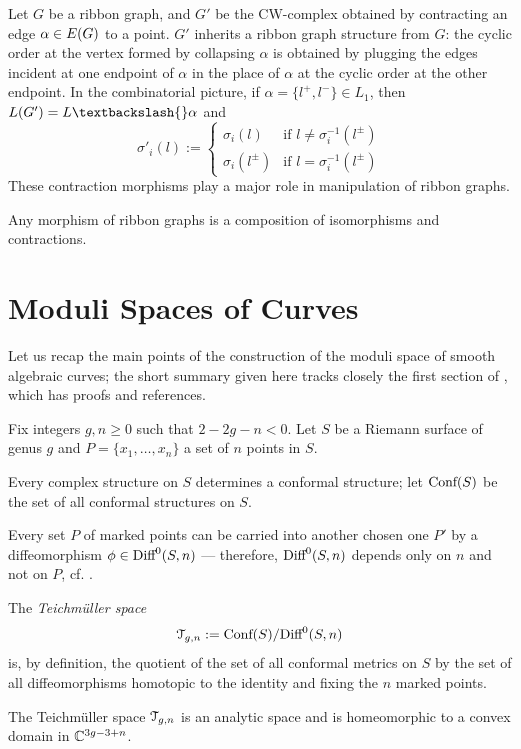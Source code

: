 Let $G$ be a ribbon graph, and $G'$ be the CW-complex obtained by
contracting an edge $\alpha \in E(G)$ to a point.  $G'$ inherits a
ribbon graph structure from $G$: the cyclic order at the vertex formed
by collapsing $\alpha$ is obtained by plugging the edges incident at one
endpoint of $\alpha$ in the place of $\alpha$ at the cyclic order at the other
endpoint.  In the combinatorial picture, if $\alpha = \{ l^+, l^- \} \in L_1$,
then $\Legs{G'} = L \textbackslash{} \alpha$ and
\begin{equation*}
  \sigma'_i(l) :=
  \begin{cases}
    \sigma_i(l)   
    & \text{if $l \not= \sigma_i^{-1}(l^{\pm})$} 
    \\
    \sigma_i(l^{\pm})   
    & \text{if $l = \sigma_i^{-1}(l^{\pm})$}
  \end{cases}
\end{equation*}
These contraction morphisms play a major role in manipulation of
ribbon graphs.
\begin{lemma}
  Any morphism of ribbon graphs is a composition of isomorphisms and
  contractions. 
\end{lemma}



\section{Moduli Spaces of Curves}
\label{sec:moduli-spaces}

Let us recap the main points of the construction of the moduli space
of smooth algebraic curves; the short summary given here tracks
closely the first section of \cite{looijenga;cellular-decomposition},
which has proofs and references.

Fix integers $g,n\geq0$ such that $2 -2g - n < 0$. Let $S$ be a Riemann
surface of genus $g$ and $P = \{ x_1, \ldots, x_n \}$ a set of $n$ points
in $S$.

Every complex structure  on $S$ determines a conformal structure; let
$\text{\rm Conf}(S)$ be the set of all conformal structures on $S$. 

Every set $P$ of marked points can be carried into another chosen one
$P'$ by a diffeomorphism $\phi \in \textrm{Diff}^0(S, n)$ --- therefore,
$\textrm{Diff}^0(S, n)$ depends only on $n$ and not on $P$, cf.
\cite{krushkal;riemann-surfaces}. 
\begin{definition}\label{dfn:teichmuller}
  The \emph{Teichm{\"u}ller space}
  \begin{equation*}
    \mathcal{T}_{g,n} := \text{\rm Conf}(S) / \textrm{Diff}^0(S, n)
  \end{equation*}
  is, by definition, the quotient of the set of all conformal metrics on
  $S$ by the set of all diffeomorphisms homotopic to the identity and
  fixing the $n$ marked points.
\end{definition}
The Teichm{\"u}ller space $\mathcal{T}_{g,n}$ is an analytic space and is
homeomorphic to a convex domain in $\mathbb{C}^{3g - 3 + n}$.

